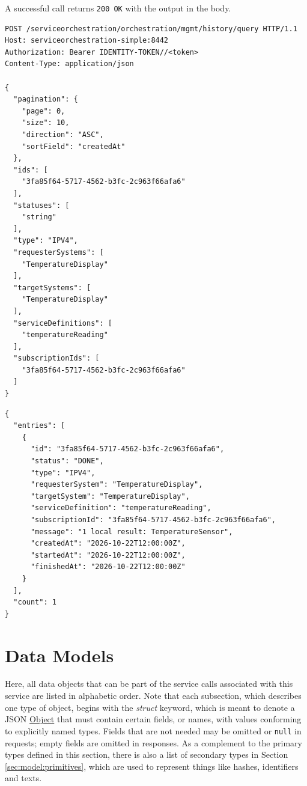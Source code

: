 \documentclass[a4paper]{arrowhead}
\newcommand{\oref}[1]{{\textcolor{ArrowheadBlue}{\hyperref[sec:operations:#1]{#1}}}}
\newcommand{\pref}[1]{{\textcolor{ArrowheadGrey}{\hyperref[sec:model:primitives:#1]{#1}}}}
\begin{document}
A successful call returns \texttt{200 OK} with the output in the body.

\begin{lstlisting}[label={lst:query},caption={An \oref{query} invocation.}]
POST /serviceorchestration/orchestration/mgmt/history/query HTTP/1.1
Host: serviceorchestration-simple:8442
Authorization: Bearer IDENTITY-TOKEN//<token>
Content-Type: application/json

{
  "pagination": {
    "page": 0,
    "size": 10,
    "direction": "ASC",
    "sortField": "createdAt"
  },
  "ids": [
    "3fa85f64-5717-4562-b3fc-2c963f66afa6"
  ],
  "statuses": [
    "string"
  ],
  "type": "IPV4",
  "requesterSystems": [
    "TemperatureDisplay"
  ],
  "targetSystems": [
    "TemperatureDisplay"
  ],
  "serviceDefinitions": [
    "temperatureReading"
  ],
  "subscriptionIds": [
    "3fa85f64-5717-4562-b3fc-2c963f66afa6"
  ]
}
\end{lstlisting}

\begin{lstlisting}[label={lst:query-resp},caption={An \oref{query} response.}]
{
  "entries": [
    {
      "id": "3fa85f64-5717-4562-b3fc-2c963f66afa6",
      "status": "DONE",
      "type": "IPV4",
      "requesterSystem": "TemperatureDisplay",
      "targetSystem": "TemperatureDisplay",
      "serviceDefinition": "temperatureReading",
      "subscriptionId": "3fa85f64-5717-4562-b3fc-2c963f66afa6",
      "message": "1 local result: TemperatureSensor",
      "createdAt": "2026-10-22T12:00:00Z",
      "startedAt": "2026-10-22T12:00:00Z",
      "finishedAt": "2026-10-22T12:00:00Z"
    }
  ],
  "count": 1
}
\end{lstlisting}

\newpage

\section{Data Models}
\label{sec:model}

Here, all data objects that can be part of the service calls associated with this service are listed in alphabetic order.
Note that each subsection, which describes one type of object, begins with the \textit{struct} keyword, which is meant to denote a JSON \pref{Object} that must contain certain fields, or names, with values conforming to explicitly named types.
Fields that are not needed may be omitted or \texttt{null} in requests; empty fields are omitted in responses.
As a complement to the primary types defined in this section, there is also a list of secondary types in Section \ref{sec:model:primitives}, which are used to represent things like hashes, identifiers and texts.
\end{document}
